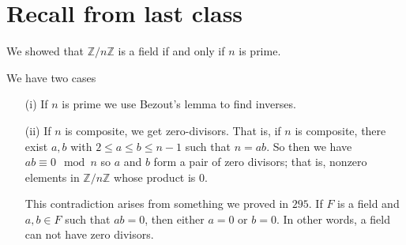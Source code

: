 
\section{Recall from last class}
\begin{eg}
	We showed that \(\mathbb{Z} /n\mathbb{Z} \) is a field if and only if \(n\) is prime.
\end{eg}
\begin{explanation}
	We have two cases
	\begin{itemize}
		\item[(i)] If \(n\) is prime we use Bezout's lemma to find inverses.
		\item[(ii)] If \(n\) is composite, we get zero-divisors. That is, if \(n\) is composite, there exist \(a,b\) with \(2\leq a\leq b\leq n-1\) such that \(n=ab\). So then we have \(ab \equiv 0 \mod n\) so \(a\) and \(b\) form a pair of zero divisors; that is, nonzero elements in \(\mathbb{Z} /n\mathbb{Z} \) whose product is \(0\).
		      \begin{note}
			      This contradiction arises from something we proved in \(295\). If \(F\) is a field and \(a,b \in F\) such that \(ab=0\), then either \(a=0\) or \(b=0\). In other words, a field can not have zero divisors.
		      \end{note}
	\end{itemize}
\end{explanation}

